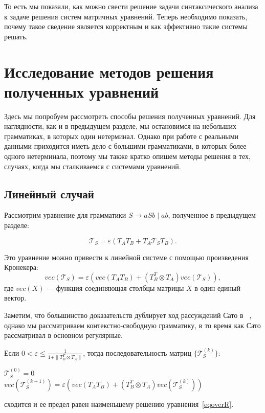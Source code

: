 \documentclass[12pt]{matmex-diploma-custom}
\begin{document}
То есть мы показали, как можно свести решение задачи синтаксического анализа к задаче решения систем матричных уравнений. 
Теперь необходимо показать, почему такое сведение является корректным и как эффективно такие системы решать.



\section{Исследование методов решения полученных уравнений}

Здесь мы попробуем рассмотреть способы решения полученных уравнений. 
Для наглядности, как и в предыдущем разделе, мы остановимся на небольших грамматиках, в которых один нетерминал.
Однако при работе с реальными данными приходится иметь дело с большими грамматиками, в которых более одного нетерминала, поэтому мы также кратко опишем методы решения в тех, случаях, когда мы сталкиваемся с системами уравнений. 

\subsection{Линейный случай}

Рассмотрим уравнение для грамматики $S \rightarrow aSb \mid ab$, полученное в предыдущем разделе:

\begin{equation}
    \mathcal{T}_S = \varepsilon (T_AT_B + T_A\mathcal{T}_S T_B).
\label{eqoverR}
\end{equation}

Это уравнение можно привести к линейной системе с помощью произведения Кронекера:
$$vec(\mathcal{T}_S) = \varepsilon (vec(T_AT_B) + (T_B^T \otimes T_A)vec(\mathcal{T}_S)),$$
где $vec(X)$ --- функция соединяющая столбцы матрицы $X$ в один единый вектор. 

Заметим, что большинство доказательств дублирует ход рассуждений Сато в ~\cite{sato2017linear}, однако мы рассматриваем контекстно-свободную грамматику, в то время как Сато рассматривал в основном регулярные.


\begin{lemma}
Если $\displaystyle  0 < \varepsilon \leq \frac{1}{1 + \| T_B^T \otimes T_A\|}$, тогда последовательность матриц $\{ \mathcal{T}_S^{(k)}\}$: 
\begin{center}
$\mathcal{T}_S^{(0)} = 0$ \\
$vec(\mathcal{T}_S^{(k+1)}) = \varepsilon (vec(T_AT_B) + (T_B^T \otimes T_A)vec(\mathcal{T}_S^{(k)}))$ 
\end{center}
сходится и ее предел равен наименьшему решению уравнения~\ref{eqoverR}.

\end{lemma}
\end{document}
